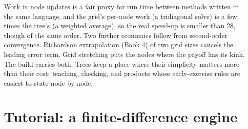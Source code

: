 Work in node updates is a fair proxy for run time between methods written in the same language, and the grid's per-node work (a tridiagonal
solve) is a few times the tree's (a weighted average), so the real speed-up is smaller than 28, though of the same order. Two further economies
follow from second-order convergence. Richardson extrapolation (Book 4) of two grid sizes cancels the leading error term. Grid stretching puts the
nodes where the payoff has its kink. The build carries both. Trees keep a place where their simplicity matters more than their cost: teaching,
checking, and products whose early-exercise rules are easiest to state node by node.

\section{Tutorial: a finite-difference engine}\label{tut:dv:trees-and-finite-difference-pricers-in-practice:tut}

